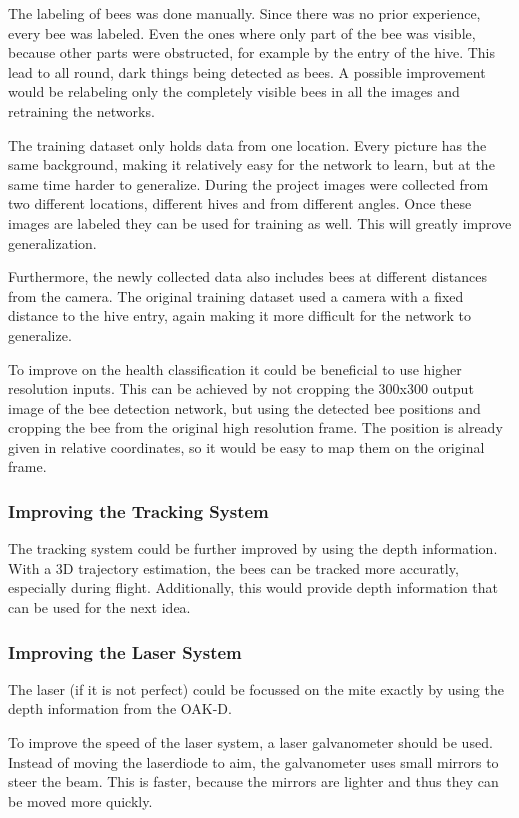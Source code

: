 \documentclass[a4paper,titlepage]{article}
\begin{document}
The labeling of bees was done manually.
Since there was no prior experience, every bee was labeled.
Even the ones where only part of the bee was visible, because other parts were obstructed, for example by the entry of the hive.
This lead to all round, dark things being detected as bees.
A possible improvement would be relabeling only the completely visible bees in all the images and retraining the networks.

The training dataset only holds data from one location.
Every picture has the same background, making it relatively easy for the network to learn, but at the same time harder to generalize.
During the project images were collected from two different locations, different hives and from different angles.
Once these images are labeled they can be used for training as well.
This will greatly improve generalization.

Furthermore, the newly collected data also includes bees at different distances from the camera.
The original training dataset used a camera with a fixed distance to the hive entry, again making it more difficult for the network to generalize.

To improve on the health classification it could be beneficial to use higher resolution inputs.
This can be achieved by not cropping the 300x300 output image of the bee detection network, but using the detected bee positions and cropping the bee from the original high resolution frame.
The position is already given in relative coordinates, so it would be easy to map them on the original frame.

\subsubsection{Improving the Tracking System}

The tracking system could be further improved by using the depth information.
With a 3D trajectory estimation, the bees can be tracked more accuratly, especially during flight.
Additionally, this would provide depth information that can be used for the next idea.

\subsubsection{Improving the Laser System}

The laser (if it is not perfect) could be focussed on the mite exactly by using the depth information from the OAK-D.

To improve the speed of the laser system, a laser galvanometer should be used.
Instead of moving the laserdiode to aim, the galvanometer uses small mirrors to steer the beam.
This is faster, because the mirrors are lighter and thus they can be moved more quickly.
\end{document}

